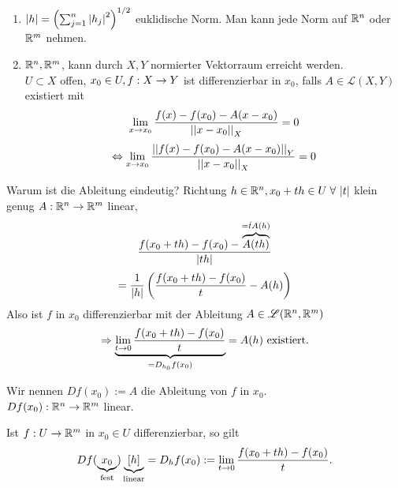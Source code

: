 \documentclass[../ana2.tex]{subfiles}
\begin{document}
\begin{bem}\leavevmode
    \begin{enumerate}
        \item \( \left|h\right| = \left( \sum_{j=1}^n \left|h_j\right|^2 \right)^{1/2} \) 
        euklidische Norm. Man kann jede Norm auf \( \mathbb{R}^n \) oder 
        \( \mathbb{R}^m \) nehmen.
        \item \( \mathbb{R}^n, \mathbb{R}^m \), kann durch \(X, Y\) 
        normierter Vektorraum erreicht werden. \\
        \( U \subset X \) offen, \( x_0 \in U, f:X\rightarrow Y \) ist
        differenzierbar in \(x_0\), falls \(A \in \mathscr{L}(X, Y) \)
        existiert mit
        \[ \lim\limits_{x\rightarrow{}x_0} \frac{f(x)-f(x_0)-A(x-x_0)}{\left|\left|x-x_0\right|\right|_X} = 0 \]
        \[ \Leftrightarrow \lim\limits_{x\rightarrow{}x_0} 
        \frac{\left|\left|f(x)-f(x_0)-A(x-x_0)\right|\right|_Y}{\left|\left|x-x_0\right|\right|_X} = 0 \]
    \end{enumerate}
    Warum ist die Ableitung eindeutig? 
    Richtung \( h \in \R^n, x_0 + th \in U 
    \;\forall \abs{t} \) klein genug
    \( A:\mathbb{R}^n\rightarrow \mathbb{R}^m \) linear, 
    \[ \frac{ f(x_0 + th) - f(x_0) - 
    \overbrace{A(th)}^{=\dot{t} A(h)} }{ \left|th\right| }\]
    \[ = \frac{1}{\left|h\right|} 
    \left( \frac{f(x_0 + th) - f(x_0)}{t} - A(h) \right) \]
    Also ist \( f \) in \( x_0 \) differenzierbar 
    mit der Ableitung \( A \in \mathscr{L}(\mathbb{R}^n, \mathbb{R}^m) \)    
    \[ \Rightarrow \underbrace{\lim\limits_{t\rightarrow{}0} \frac{f(x_0+th) 
    - f(x_0)}{t}}_{= D_{h_0}f(x_0)} = A(h) 
    \text{ existiert.} \]
\end{bem}
\begin{notation}
    Wir nennen \( D f(x_0) := A \) die 
    Ableitung von \(f\) in \(x_0\).\\
    \( Df(x_0):\mathbb{R}^n\rightarrow \mathbb{R}^m \) linear.
\end{notation}
\begin{satz}
    Ist \( f:U\rightarrow \mathbb{R}^m \) in \( x_0 \in U \)
    differenzierbar, so gilt 
    \[ Df(\underbrace{x_0}_{\text{fest}})\underbrace{[h]}_{\text{linear}} 
    = D_h f(x_0) 
    := \lim\limits_{t\rightarrow{}0} \frac{f(x_0 + th) - f(x_0)}{t}. \]
\end{satz}
\end{document}

